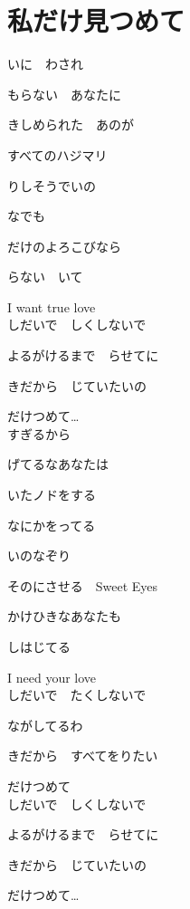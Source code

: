 \section{ 私だけ見つめて}
\large{

いに　わされ

もらない　あなたに

きしめられた　あのが

すべてのハジマリ

りしそうでいの

なでも

だけのよろこびなら

らない　いて

I want true love
\\

しだいで　しくしないで

よるがけるまで　らせてに

きだから　じていたいの

だけつめて…
\\

すぎるから

げてるなあなたは

いたノドをする

なにかをってる

いのなぞり

そのにさせる　Sweet Eyes

かけひきなあなたも

しはじてる

I need your love
\\

しだいで　たくしないで

ながしてるわ

きだから　すべてをりたい

だけつめて
\\

しだいで　しくしないで

よるがけるまで　らせてに

きだから　じていたいの

だけつめて…

}